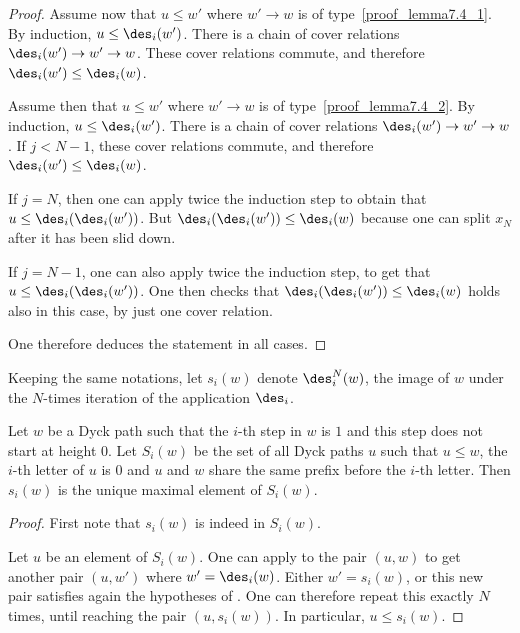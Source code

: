 \begin{proof}
  Assume now that $u \leq w'$ where $w' \to w$ is of type~\eqref{proof_lemma7.4_1}. By
  induction, $u \leq \des_i(w')$. There is a chain of cover relations
  $\des_i(w') \to w' \to w$. These cover relations commute, and therefore
  $\des_i(w') \leq \des_i(w)$.

  Assume then that $u \leq w'$ where $w' \to w$ is of type~\eqref{proof_lemma7.4_2}. By
  induction, $u \leq \des_i(w')$. There is a chain of cover relations
  $\des_i(w') \to w' \to w$. If $j < N - 1$, these cover relations
  commute, and therefore $\des_i(w') \leq \des_i(w)$.

  If $j = N$, then one can apply twice the induction step to obtain that
  $u \leq \des_i(\des_i(w'))$. But $\des_i(\des_i(w')) \leq \des_i(w)$
  because one can split $x_N$ after it has been slid down.

  If $j = N-1$, one can also apply twice the induction step, to get
  that $u \leq \des_i(\des_i(w'))$. One then checks that
  $\des_i(\des_i(w')) \leq \des_i(w)$ holds also in this case, by just
  one cover relation.

  One therefore deduces the statement in all cases.
\end{proof}

Keeping the same notations, let $s_i(w)$ denote $\des_i^N(w)$, the
image of $w$ under the $N$-times iteration of the application
$\des_i$.

\begin{lemma}
  \label{force_0}
  Let $w$ be a Dyck path such that the $i$-th step in $w$ is $1$ and
  this step does not start at height $0$. Let $S_i(w)$ be the set
  of all Dyck paths $u$ such that $u \leq w$, the $i$-th letter of $u$
  is $0$ and $u$ and $w$ share the same prefix before the $i$-th letter.
  Then $s_i(w)$ is the unique maximal element of $S_i(w)$.
\end{lemma}
\begin{proof}
  First note that $s_i(w)$ is indeed in $S_i(w)$.

  Let $u$ be an element of $S_i(w)$. One can apply 
  to the pair $(u,w)$ to get another pair $(u, w')$ where
  $w'=\des_i(w)$. Either $w' = s_i(w)$, or this new pair satisfies
  again the hypotheses of . One can therefore repeat
  this exactly $N$ times, until reaching the pair $(u,s_i(w))$. In
  particular, $u \leq s_i(w)$.
\end{proof}


